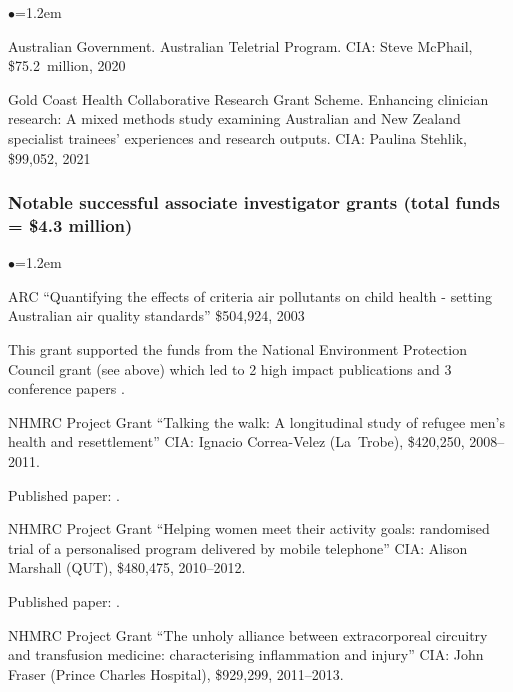 \documentclass[a4paper,11pt]{article}
\renewcommand{\labelitemi}{$\bullet$}
\begin{document}
\begin{raggedright}
\begin{list}{\labelitemi}{\leftmargin=1.2em}
\item Australian Government. Australian Teletrial Program. CIA: Steve McPhail, \$75.2~million, 2020

\item Gold Coast Health Collaborative Research Grant Scheme. Enhancing clinician research: A mixed methods study examining Australian and New Zealand specialist trainees' experiences and research outputs. CIA: Paulina Stehlik, \$99,052, 2021 


\end{list}


\subsubsection*{Notable successful associate investigator grants (total funds = \$4.3 million)} %

\begin{list}{\labelitemi}{\leftmargin=1.2em}\addtolength{\itemsep}{-0.5\baselineskip}

\item ARC ``Quantifying the effects of criteria air pollutants on child health - setting Australian air quality standards'' \$504,924, 2003

    This grant supported the funds from the National Environment Protection Council grant (see above) which led to 2 high impact publications  and 3 conference papers .

\item NHMRC Project Grant ``Talking the walk: A longitudinal study of refugee men's health and resettlement'' CIA: Ignacio Correa-Velez (La~Trobe), \$420,250, 2008--2011. 

    Published paper: .


\item NHMRC Project Grant ``Helping women meet their activity goals: randomised trial of a personalised program delivered by mobile telephone'' CIA: Alison Marshall (QUT), \$480,475, 2010--2012.

    Published paper: .

\item NHMRC Project Grant ``The unholy alliance between extracorporeal circuitry and transfusion medicine: characterising inflammation and injury'' CIA: John Fraser (Prince Charles Hospital), \$929,299, 2011--2013.


\end{list}
\end{raggedright}
\end{document}
